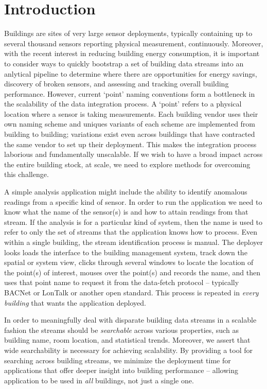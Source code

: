 \section{Introduction}

Buildings are sites of very large sensor deployments, typically containing
up to several thousand sensors reporting physical measurement, continuously.
Moreover, with the recent interest in reducing building energy consumption, it
is important to consider ways to quickly bootstrap a set of building data streams
into an anlytical pipeline to determine where there are opportunities for energy savings,
discovery of broken sensors, and assessing and tracking overall building performance.
However, current `point' naming conventions form a bottleneck in the scalability of
the data integration process.  A `point' refers to a physical location where
a sensor is taking measurements. Each building vendor uses their own naming scheme and
uniques variants of each scheme are implemented from building to building; variations exist
even across buildings that have contracted the same vendor to set up their deployment.
This makes the integration process laborious and fundamentally unscalable.  If we
wish to have a broad impact across the entire building stock, at scale, we need
to explore methods for overcoming this challenge.

A simple analysis application might include the ability
to identify anomalous readings from a specific kind of sensor.  In order to run the application
we need to know what the name of the sensor(s) is and how to attain readings from that 
stream.  If the analysis is for a particular kind of system, then the name is used to refer to 
only the set of streams that the application knows how to process.  Even within a single building,
the stream identification process is manual.  The deployer looks loads the interface to the 
building management system, track down the spatial or system view, clicks through several windows
to locate the location of the point(s) of interest, mouses over the point(s) and records the name,
and then uses that point name to request it from the data-fetch protocol -- typically BACNet or 
LonTalk or another open standard.  This process is repeated in \emph{every building} that wants
the application deployed.

In order to meaningfully deal with disparate building data streams in a scalable 
fashion the streams should be \emph{searchable} across various properties, such
as building name, room location, and statistical trends.  Moreover, we
assert that wide searchability is necessary for achieving scalability.  By providing a tool for
searching across building streams, we minimize the deployment time for applications that 
offer deeper insight into building performance -- allowing application  to be used in \emph{all}
buildings, not just a single one.


